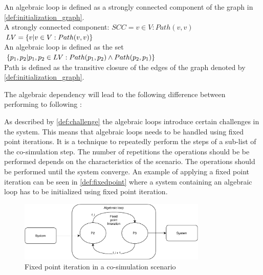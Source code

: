 \begin{definition} 
An algebraic loop is defined as a strongly connected component of the graph in \cref{def:initialization_graph}. \\
A strongly connected component: $SCC = v \in V: Path(v,v)$\\
$LV = \{v | v \in V : Path(v,v)\}$ \\
An algebraic loop is defined as the set $\{p_1, p_2 | p_1, p_2 \in LV: Path(p_1, p_2) \land Path(p_2, p_1)\}$\\
Path is defined as the transitive closure of the edges of the graph denoted by \cref{def:initialization_graph}.\\
\end{definition}

\begin{definition}\label{def:challenge}
The algebraic dependency will lead to the following difference between performing to following :
\end{definition}

As described by \cref{def:challenge} the algebraic loops introduce certain challenges in the system. This means that algebraic loops needs to be handled using fixed point iterations\cite{Gomes2018}. It is a technique to repeatedly perform the steps of a sub-list of the co-simulation step. The number of repetitions the operations should be be performed depends on the characteristics of the scenario. The operations should be performed until the system converge. 
An example of applying a fixed point iteration can be seen in \cref{def:fixedpoint} where a system containing an algebraic loop has to be initialized using fixed point iteration.

\begin{figure}[H]
    \centering
    \includegraphics[width=0.8\textwidth]{images/fixedpoint.pdf}
    \caption{Fixed point iteration in a co-simulation scenario}
    \label{fig:fixedpont}
\end{figure}


